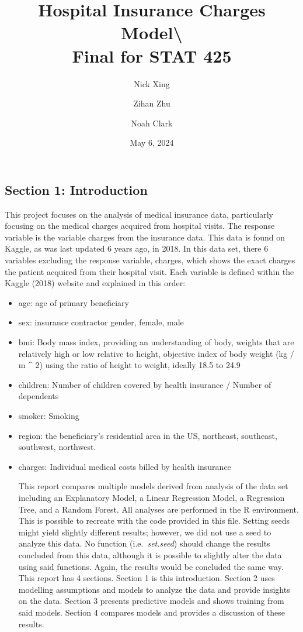 \documentclass[
  12pt,
]{article}
\title{Hospital Insurance Charges Model\textbackslash{} \vspace{0.5cm}\\
Final for STAT 425}
\author{Nick Xing \and Zihan Zhu \and Noah Clark}
\date{May 6, 2024}
\begin{document}
\maketitle

{
\setcounter{tocdepth}{3}
\tableofcontents
}
\newpage

\subsection{Section 1: Introduction}\label{section-1-introduction}

This project focuses on the analysis of medical insurance data,
particularly focusing on the medical charges acquired from hospital
visits. The response variable is the variable charges from the insurance
data. This data is found on Kaggle, as was last updated 6 years ago, in
2018. In this data set, there 6 variables excluding the response
variable, charges, which shows the exact charges the patient acquired
from their hospital visit. Each variable is defined within the Kaggle
(2018) website and explained in this order:

\begin{itemize}
\item
  age: age of primary beneficiary
\item
  sex: insurance contractor gender, female, male
\item
  bmi: Body mass index, providing an understanding of body, weights that
  are relatively high or low relative to height, objective index of body
  weight (kg / m \^{} 2) using the ratio of height to weight, ideally
  18.5 to 24.9
\item
  children: Number of children covered by health insurance / Number of
  dependents
\item
  smoker: Smoking
\item
  region: the beneficiary's residential area in the US, northeast,
  southeast, southwest, northwest.
\item
  charges: Individual medical costs billed by health insurance

  This report compares multiple models derived from analysis of the data
  set including an Explanatory Model, a Linear Regression Model, a
  Regression Tree, and a Random Forest. All analyses are performed in
  the R environment. This is possible to recreate with the code provided
  in this file. Setting seeds might yield slightly different results;
  however, we did not use a seed to analyze this data. No function
  (i.e.~\emph{set.seed}) should change the results concluded from this
  data, although it is possible to slightly alter the data using said
  functions. Again, the results would be concluded the same way. This
  report has 4 sections. Section 1 is this introduction. Section 2 uses
  modelling assumptions and models to analyze the data and provide
  insights on the data. Section 3 presents predictive models and shows
  training from said models. Section 4 compares models and provides a
  discussion of these results.
\end{itemize}
\end{document}
